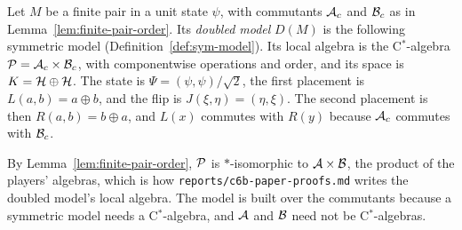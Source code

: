 \begin{definition}
\label{def:doubled-model}
\leanok
Let $M$ be a finite pair in a unit state $\psi$, with commutants $\cal{A}_c$ and $\cal{B}_c$ as in
Lemma~\ref{lem:finite-pair-order}. Its \emph{doubled model} $D(M)$ is the following symmetric model
(Definition~\ref{def:sym-model}). Its local algebra is the C$^*$-algebra $\cal{P} = \cal{A}_c \times
\cal{B}_c$, with componentwise operations and order, and its space is $K = \mH \oplus \mH$. The state
is $\Psi = (\psi, \psi)/\sqrt{2}$, the first placement is $L(a, b) = a \oplus b$, and the flip is
$J(\xi, \eta) = (\eta, \xi)$. The second placement is then $R(a, b) = b \oplus a$, and $L(x)$
commutes with $R(y)$ because $\cal{A}_c$ commutes with $\cal{B}_c$.

By Lemma~\ref{lem:finite-pair-order}, $\cal{P}$ is $*$-isomorphic to $\cal{A} \times \cal{B}$, the
product of the players' algebras, which is how \texttt{reports/c6b-paper-proofs.md} writes the
doubled model's local algebra. The model is built over the commutants because a symmetric model
needs a C$^*$-algebra, and $\cal{A}$ and $\cal{B}$ need not be C$^*$-algebras.
\end{definition}

